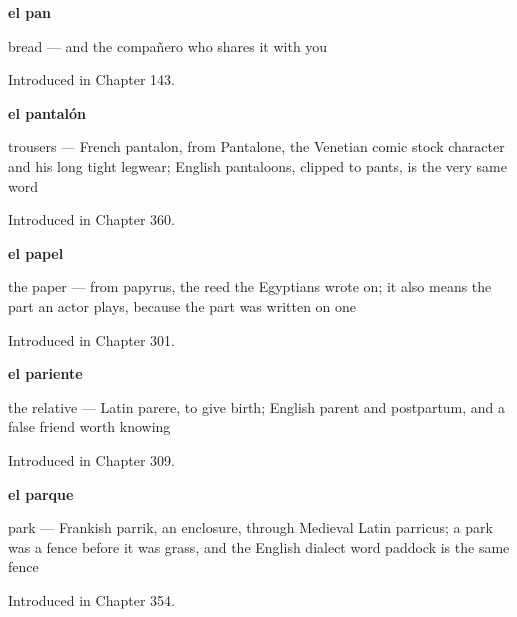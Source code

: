 \noindent\begin{minipage}[t]{\linewidth}
\raggedright
\textbf{el pan}\par
\small bread — and the compañero who shares it with you\par
\footnotesize Introduced in Chapter 143.
\end{minipage}\par\medskip

\noindent\begin{minipage}[t]{\linewidth}
\raggedright
\textbf{el pantalón}\par
\small trousers — French pantalon, from Pantalone, the Venetian comic stock character and his long tight legwear; English pantaloons, clipped to pants, is the very same word\par
\footnotesize Introduced in Chapter 360.
\end{minipage}\par\medskip

\noindent\begin{minipage}[t]{\linewidth}
\raggedright
\textbf{el papel}\par
\small the paper — from papyrus, the reed the Egyptians wrote on; it also means the part an actor plays, because the part was written on one\par
\footnotesize Introduced in Chapter 301.
\end{minipage}\par\medskip

\noindent\begin{minipage}[t]{\linewidth}
\raggedright
\textbf{el pariente}\par
\small the relative --- Latin parere, to give birth; English parent and postpartum, and a false friend worth knowing\par
\footnotesize Introduced in Chapter 309.
\end{minipage}\par\medskip

\noindent\begin{minipage}[t]{\linewidth}
\raggedright
\textbf{el parque}\par
\small park — Frankish parrik, an enclosure, through Medieval Latin parricus; a park was a fence before it was grass, and the English dialect word paddock is the same fence\par
\footnotesize Introduced in Chapter 354.
\end{minipage}\par\medskip

